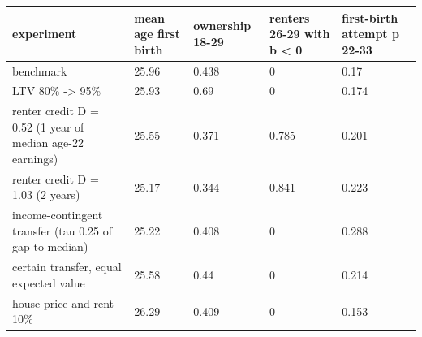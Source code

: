 \begingroup\small
\setlength{\tabcolsep}{3pt}
\renewcommand{\arraystretch}{1.04}
\begin{tabularx}{\linewidth}{XXXXX}
\toprule
experiment & mean age first birth & ownership 18-29 & renters 26-29 with b \textless{} 0 & first-birth attempt p 22-33 \\
\midrule
benchmark & 25.96 & 0.438 & 0 & 0.17 \\
LTV 80\% -\textgreater{} 95\% & 25.93 & 0.69 & 0 & 0.174 \\
renter credit D = 0.52 (1 year of median age-22 earnings) & 25.55 & 0.371 & 0.785 & 0.201 \\
renter credit D = 1.03 (2 years) & 25.17 & 0.344 & 0.841 & 0.223 \\
income-contingent transfer (tau 0.25 of gap to median) & 25.22 & 0.408 & 0 & 0.288 \\
certain transfer, equal expected value & 25.58 & 0.44 & 0 & 0.214 \\
house price and rent 10\% & 26.29 & 0.409 & 0 & 0.153 \\
\bottomrule
\end{tabularx}
\endgroup
